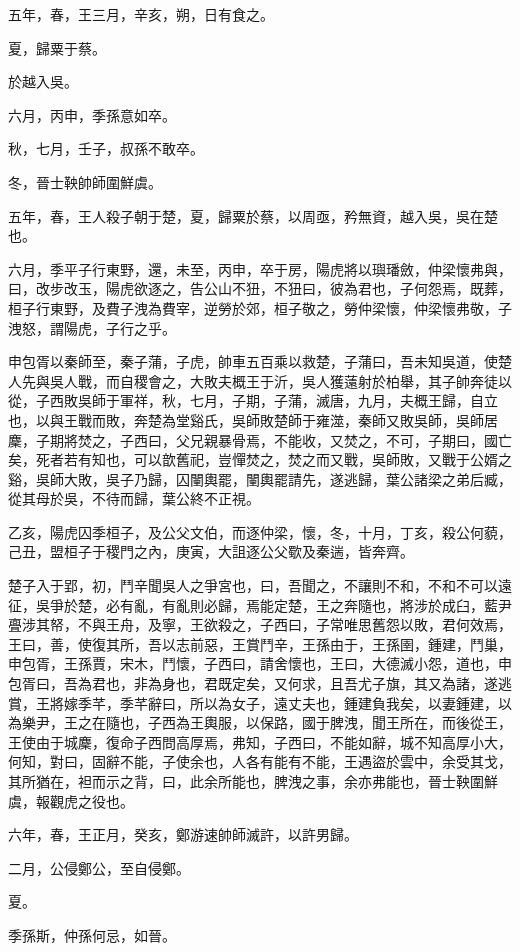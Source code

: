 \begin{pinyinscope}
五年，春，王三月，辛亥，朔，日有食之。

夏，歸粟于蔡。

於越入吳。

六月，丙申，季孫意如卒。

秋，七月，壬子，叔孫不敢卒。

冬，晉士鞅帥師圍鮮虞。

五年，春，王人殺子朝于楚，夏，歸粟於蔡，以周亟，矜無資，越入吳，吳在楚也。

六月，季平子行東野，還，未至，丙申，卒于房，陽虎將以璵璠斂，仲梁懷弗與，曰，改步改玉，陽虎欲逐之，告公山不狃，不狃曰，彼為君也，子何怨焉，既葬，桓子行東野，及費子洩為費宰，逆勞於郊，桓子敬之，勞仲梁懷，仲梁懷弗敬，子洩怒，謂陽虎，子行之乎。

申包胥以秦師至，秦子蒲，子虎，帥車五百乘以救楚，子蒲曰，吾未知吳道，使楚人先與吳人戰，而自稷會之，大敗夫概王于沂，吳人獲薳射於柏舉，其子帥奔徒以從，子西敗吳師于軍祥，秋，七月，子期，子蒲，滅唐，九月，夫概王歸，自立也，以與王戰而敗，奔楚為堂谿氏，吳師敗楚師于雍澨，秦師又敗吳師，吳師居麇，子期將焚之，子西曰，父兄親暴骨焉，不能收，又焚之，不可，子期曰，國亡矣，死者若有知也，可以歆舊祀，豈憚焚之，焚之而又戰，吳師敗，又戰于公婿之谿，吳師大敗，吳子乃歸，囚闉輿罷，闉輿罷請先，遂逃歸，葉公諸梁之弟后臧，從其母於吳，不待而歸，葉公終不正視。

乙亥，陽虎囚季桓子，及公父文伯，而逐仲梁，懷，冬，十月，丁亥，殺公何藐，己丑，盟桓子于稷門之內，庚寅，大詛逐公父歜及秦遄，皆奔齊。

楚子入于郢，初，鬥辛聞吳人之爭宮也，曰，吾聞之，不讓則不和，不和不可以遠征，吳爭於楚，必有亂，有亂則必歸，焉能定楚，王之奔隨也，將涉於成臼，藍尹亹涉其帑，不與王舟，及寧，王欲殺之，子西曰，子常唯思舊怨以敗，君何效焉，王曰，善，使復其所，吾以志前惡，王賞鬥辛，王孫由于，王孫圉，鍾建，鬥巢，申包胥，王孫賈，宋木，鬥懷，子西曰，請舍懷也，王曰，大德滅小怨，道也，申包胥曰，吾為君也，非為身也，君既定矣，又何求，且吾尤子旗，其又為諸，遂逃賞，王將嫁季芊，季芊辭曰，所以為女子，遠丈夫也，鍾建負我矣，以妻鍾建，以為樂尹，王之在隨也，子西為王輿服，以保路，國于脾洩，聞王所在，而後從王，王使由于城麇，復命子西問高厚焉，弗知，子西曰，不能如辭，城不知高厚小大，何知，對曰，固辭不能，子使余也，人各有能有不能，王遇盜於雲中，余受其戈，其所猶在，袒而示之背，曰，此余所能也，脾洩之事，余亦弗能也，晉士鞅圍鮮虞，報觀虎之役也。

六年，春，王正月，癸亥，鄭游速帥師滅許，以許男歸。

二月，公侵鄭公，至自侵鄭。

夏。

季孫斯，仲孫何忌，如晉。


\end{pinyinscope}
